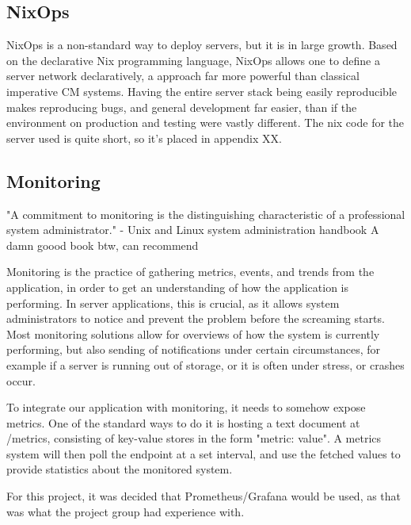 \subsection{NixOps}
NixOps is a non-standard way to deploy servers, but it is in large growth.
Based on the declarative Nix programming language, NixOps allows one to define a server network declaratively, a approach far more powerful than classical imperative CM systems.
Having the entire server stack being easily reproducible makes reproducing bugs, and general development far easier, than if the environment on production and testing were vastly different.
The nix code for the server used is quite short, so it's placed in appendix XX.

\subsection{Monitoring}
"A commitment to monitoring is the distinguishing characteristic of a professional system administrator." - Unix and Linux system administration handbook
A damn goood book btw, can recommend

Monitoring is the practice of gathering metrics, events, and trends from the application, in order to get an understanding of how the application is performing.
In server applications, this is crucial, as it allows system administrators to notice and prevent the problem before the screaming starts.
Most monitoring solutions allow for overviews of how the system is currently performing, but also sending of notifications under certain circumstances, for example if a server is running out of storage, or it is often under stress, or crashes occur.

To integrate our application with monitoring, it needs to somehow expose metrics.
One of the standard ways to do it is hosting a text document at /metrics, consisting of key-value stores in the form "metric: value".
A metrics system will then poll the endpoint at a set interval, and use the fetched values to provide statistics about the monitored system.

For this project, it was decided that Prometheus/Grafana would be used, as that was what the project group had experience with.
